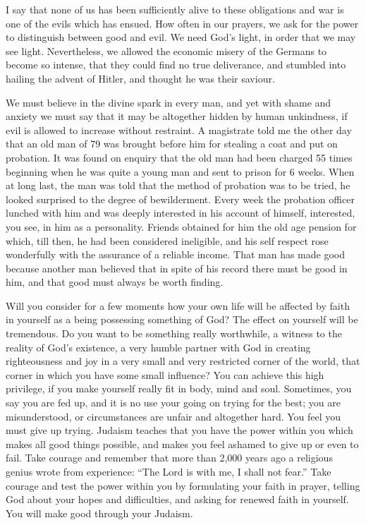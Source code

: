 I say that none of us has been sufficiently alive to
these obligations and war is one of the evils which has
ensued. How often in our prayers, we ask for the power to
distinguish between good and evil. We need God's light, in
order that we may see light. Nevertheless, we allowed the
economic misery of the Germans to become so intense, that
they could find no true deliverance, and stumbled into
hailing the advent of Hitler, and thought he was their
saviour.

We must believe in the divine spark in every man, and
yet with shame and anxiety we must say that it may be altogether
hidden by human unkindness, if evil is allowed to
increase without restraint. A magistrate told me the other
day that an old man of 79 was brought before him for
stealing a coat and put on probation. It was found on
enquiry that the old man had been charged 55 times
beginning when he was quite a young man and sent to prison
for 6 weeks. When at long last, the man was told that the
method of probation was to be tried, he looked surprised to
the degree of bewilderment. Every week the probation
officer lunched with him and was deeply interested in his
account of himself, interested, you see, in him as a
personality. Friends obtained for him the old age pension
for which, till then, he had been considered ineligible,
and his self respect rose wonderfully with the assurance of
a reliable income. That man has made good because another
man believed that in spite of his record there must be good
in him, and that good must always be worth finding.

Will you consider for a few moments how your own life
will be affected by faith in yourself as a being possessing
something of God? The effect on yourself will be tremendous.
Do you want to be something really worthwhile, a
witness to the reality of God's existence, a very humble
partner with God in creating righteousness and joy in a
very small and very restricted corner of the world, that
corner in which you have some small influence? You can
achieve this high privilege, if you make yourself really
fit in body, mind and soul. Sometimes, you say you are fed
up, and it is no use your going on trying for the best; you
are misunderstood, or circumstances are unfair and
altogether hard. You feel you must give up trying.
Judaism teaches that you have the power within you which
makes all good things possible, and makes you feel ashamed
to give up or even to fail. Take courage and remember that
more than 2,000 years ago a religious genius wrote from
experience: ``The Lord is with me, I shall not fear.'' Take
courage and test the power within you by formulating your
faith in prayer, telling God about your hopes and
difficulties, and asking for renewed faith in yourself.
You will make good through your Judaism.

